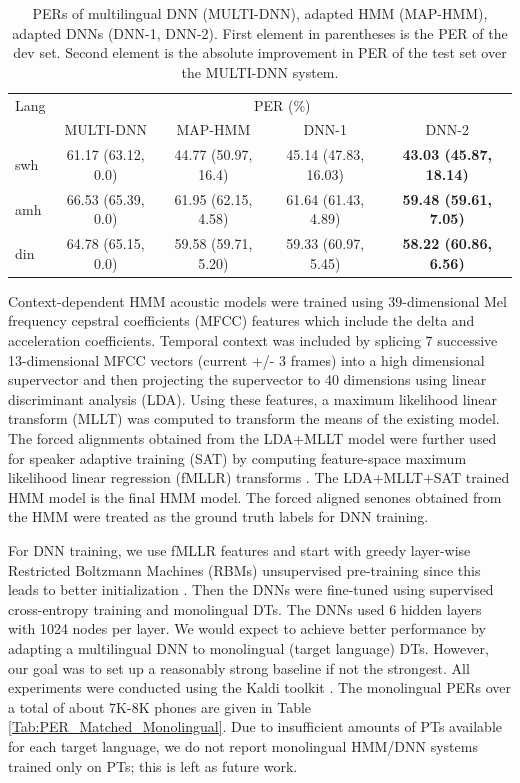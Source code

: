 \documentclass[a4paper]{article}
\begin{document}
\begin{table}[t]
\centering %
\caption{PERs of multilingual DNN (MULTI-DNN), adapted HMM (MAP-HMM), adapted DNNs (DNN-1, DNN-2). First element in parentheses is the PER of the dev set. Second element is the absolute improvement in PER of the test set over the MULTI-DNN system.}
\begin{tabular}{l|c c c c}
   \hline
Lang  & \multicolumn{4}{c}{PER (\%)} \\
        &MULTI-DNN        	   &MAP-HMM         		&DNN-1          &DNN-2          \\ \hline
swh      & 61.17 (63.12, 0.0) &44.77 (50.97, 16.4) &45.14 (47.83, 16.03) &\bf{43.03 (45.87, 18.14)}        \\
amh      & 66.53 (65.39, 0.0) &61.95 (62.15, 4.58)  &61.64  (61.43, 4.89) &\bf{59.48 (59.61, 7.05)}     \\
din      &64.78 (65.15, 0.0) &59.58 (59.71, 5.20)  &59.33 (60.97, 5.45)  &\bf{58.22 (60.86, 6.56)}    \\ \hline
\end{tabular}
\vspace{-5mm}
\label{Tab:PER_PT}
\end{table}

Context-dependent HMM acoustic models were trained using 39-dimensional Mel frequency cepstral coefficients (MFCC) features which include the delta and acceleration coefficients. Temporal context was included by splicing 7 successive 13-dimensional MFCC vectors (current +/- 3 frames) into a high dimensional supervector and then projecting the supervector to 40 dimensions using linear discriminant analysis (LDA). Using these features, a maximum likelihood linear transform (MLLT) \cite{Gopinath-MLLT} was computed to transform the means of the existing model. The forced alignments obtained from the LDA+MLLT model were further used for speaker adaptive training (SAT) by computing feature-space maximum likelihood linear regression (fMLLR) transforms \cite{Gales-CMLLR}. The LDA+MLLT+SAT trained HMM model is the final HMM model. The forced aligned senones obtained from the HMM were treated as the ground truth labels for DNN training.

For DNN training, we use fMLLR features and start with greedy layer-wise Restricted Boltzmann Machines (RBMs) unsupervised pre-training since this leads to better initialization \cite{Bengio-Pretraining}. Then the DNNs were fine-tuned using supervised cross-entropy training and monolingual DTs. The DNNs used 6 hidden layers with 1024 nodes per layer. We would expect to achieve better performance by adapting a multilingual DNN to monolingual (target language) DTs. However, our goal was to set up a reasonably strong baseline if not the strongest. All experiments were conducted using the Kaldi toolkit \cite{Povey-Kaldi}. The monolingual PERs over a total of about 7K-8K phones are given in Table \ref{Tab:PER_Matched_Monolingual}. Due to insufficient amounts  of PTs available for each target language, we do not report monolingual HMM/DNN systems trained only on PTs; this is left as future work.
\end{document}
